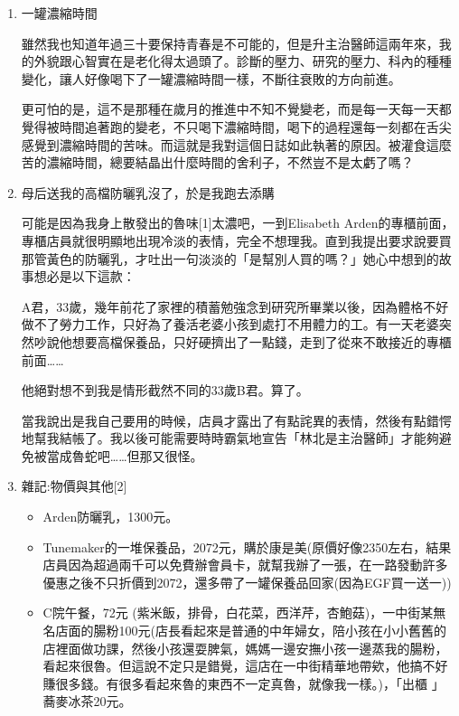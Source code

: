 \documentclass[a5paper, 12pt
]{book}
\providecommand{\tightlist}{%
  \setlength{\itemsep}{0pt}\setlength{\parskip}{0pt}}
\begin{document}
\begin{enumerate}
\def\labelenumi{\arabic{enumi}.}
\item
  一罐濃縮時間

  雖然我也知道年過三十要保持青春是不可能的，但是升主治醫師這兩年來，我的外貌跟心智實在是老化得太過頭了。診斷的壓力、研究的壓力、科內的種種變化，讓人好像喝下了一罐濃縮時間一樣，不斷往衰敗的方向前進。

  更可怕的是，這不是那種在歲月的推進中不知不覺變老，而是每一天每一天都覺得被時間追著跑的變老，不只喝下濃縮時間，喝下的過程還每一刻都在舌尖感覺到濃縮時間的苦味。而這就是我對這個日誌如此執著的原因。被灌食這麼苦的濃縮時間，總要結晶出什麼時間的舍利子，不然豈不是太虧了嗎？
\item
  母后送我的高檔防曬乳沒了，於是我跑去添購

  可能是因為我身上散發出的魯味{[}1{]}太濃吧，一到Elisabeth
  Arden的專櫃前面，專櫃店員就很明顯地出現冷淡的表情，完全不想理我。直到我提出要求說要買那管黃色的防曬乳，才吐出一句淡淡的「是幫別人買的嗎？」她心中想到的故事想必是以下這款：

  A君，33歲，幾年前花了家裡的積蓄勉強念到研究所畢業以後，因為體格不好做不了勞力工作，只好為了養活老婆小孩到處打不用體力的工。有一天老婆突然吵說他想要高檔保養品，只好硬擠出了一點錢，走到了從來不敢接近的專櫃前面\ldots\ldots{}

  他絕對想不到我是情形截然不同的33歲B君。算了。

  當我說出是我自己要用的時候，店員才露出了有點詫異的表情，然後有點錯愕地幫我結帳了。我以後可能需要時時霸氣地宣告「林北是主治醫師」才能夠避免被當成魯蛇吧\ldots\ldots 但那又很怪。
\item
  雜記:物價與其他{[}2{]}

  \begin{itemize}
  \tightlist
  \item
    Arden防曬乳，1300元。
  \item
    Tunemaker的一堆保養品，2072元，購於康是美(原價好像2350左右，結果店員因為超過兩千可以免費辦會員卡，就幫我辦了一張，在一路發動許多優惠之後不只折價到2072，還多帶了一罐保養品回家(因為EGF買一送一))
  \item
    C院午餐，72元
    (紫米飯，排骨，白花菜，西洋芹，杏鮑菇)，一中街某無名店面的腸粉100元(店長看起來是普通的中年婦女，陪小孩在小小舊舊的店裡面做功課，然後小孩還耍脾氣，媽媽一邊安撫小孩一邊蒸我的腸粉，看起來很魯。但這說不定只是錯覺，這店在一中街精華地帶欸，他搞不好賺很多錢。有很多看起來魯的東西不一定真魯，就像我一樣。)，「出櫃
    」蕎麥冰茶20元。
  \end{itemize}
\end{enumerate}
\end{document}
